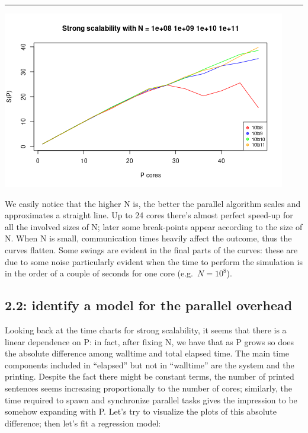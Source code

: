 \documentclass[
  10pt,
]{article}
\begin{document}
\begin{center}\rule{0.5\linewidth}{0.5pt}\end{center}

\begin{center}\includegraphics{figs/ss_scal-1} \end{center}

We easily notice that the higher N is, the better the parallel algorithm
scales and approximates a straight line. Up to 24 cores there's almost
perfect speed-up for all the involved sizes of N; later some
break-points appear according to the size of N. When N is small,
communication times heavily affect the outcome, thus the curves flatten.
Some swings are evident in the final parts of the curves: these are due
to some noise particularly evident when the time to perform the
simulation is in the order of a couple of seconds for one core
(e.g.~\(N=10^8\)).

\hypertarget{identify-a-model-for-the-parallel-overhead}{%
\subsection{2.2: identify a model for the parallel
overhead}\label{identify-a-model-for-the-parallel-overhead}}

Looking back at the time charts for strong scalability, it seems that
there is a linear dependence on P: in fact, after fixing N, we have that
as P grows so does the absolute difference among walltime and total
elapsed time. The main time components included in ``elapsed'' but not
in ``walltime'' are the system and the printing. Despite the fact there
might be constant terms, the number of printed sentences seems
increasing proportionally to the number of cores; similarly, the time
required to spawn and synchronize parallel tasks gives the impression to
be somehow expanding with P. Let's try to visualize the plots of this
absolute difference; then let's fit a regression model:
\end{document}
